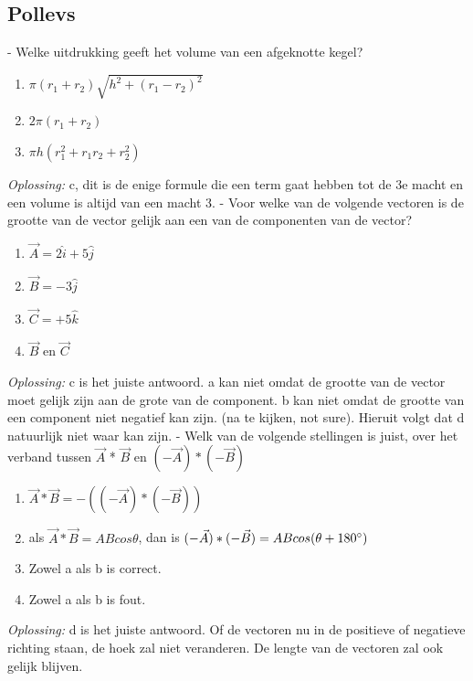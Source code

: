 \documentclass[12pt,a4paper]{article}
\begin{document}
    \subsection{Pollevs}
    - Welke uitdrukking geeft het volume van een afgeknotte kegel?
    \begin{enumerate}
        [label=\alph*)]
        \item \(\pi(r_1 + r_2)\sqrt{h^2 + (r_1 - r_2)^2}\)
        \item \(2\pi(r_1 + r_2)\)
        \item \(\pi h(r_1^2 + r_1r_2 + r_2^2)\)
    \end{enumerate}
    \textit{Oplossing:} c, dit is de enige formule die een term gaat hebben tot de 3e macht en een volume is altijd van een macht 3.
    \newline
    - Voor welke van de volgende vectoren is de grootte van de vector gelijk aan een van de componenten van de vector?
    \begin{enumerate}
        [label = \alph*)]
        \item \(\vec{A} = 2\hat{i} + 5\hat{j}\)
        \item \(\vec{B} = -3\hat{j}\)
        \item \(\vec{C} = +5\hat{k}\)
        \item \(\vec{B} \text{ en } \vec{C}\)
    \end{enumerate}
    \textit{Oplossing:} c is het juiste antwoord. a kan niet omdat de grootte van de vector moet gelijk zijn aan de grote van de component. b kan niet omdat de grootte van een component niet negatief kan zijn. (na te kijken, not sure). Hieruit volgt dat d natuurlijk niet waar kan zijn.
    \newline
    - Welk van de volgende stellingen is juist, over het verband tussen $\vec{A}$ * $\vec{B}$ en \((-\vec{A}) * (-\vec{B})\)
    \begin{enumerate}
        [label=\alph*)]
        \item \(\vec{A} * \vec{B} = -((-\vec{A})*(-\vec{B}))\)
        \item als \(\vec{A} * \vec{B} = ABcos\theta \), dan is \((-\vec{A}) * (-\vec{B}) = ABcos(\theta + 180\degree)\)
        \item Zowel a als b is correct.
        \item Zowel a als b is fout.
    \end{enumerate}
    \textit{Oplossing:} d is het juiste antwoord. Of de vectoren nu in de positieve of negatieve richting staan, de hoek zal niet veranderen. De lengte van de vectoren zal ook gelijk blijven.
\end{document}
